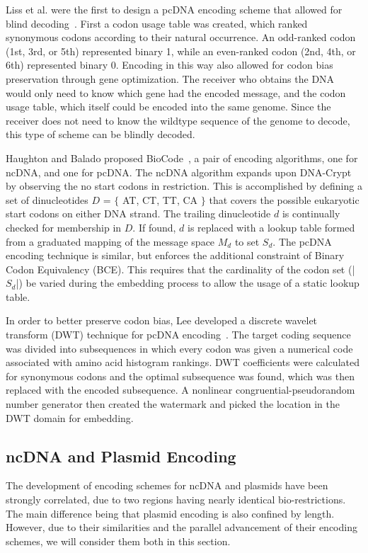 \documentclass{bioinfo}
\begin{document}
Liss et al. were the first to design a pcDNA encoding scheme that allowed for blind decoding~\cite{LDBKHLW2012PO}. First a codon usage table was created, which ranked synonymous codons according to their natural occurrence. An odd-ranked codon (1st, 3rd, or 5th) represented binary 1, while an even-ranked codon (2nd, 4th, or 6th) represented binary 0. Encoding in this way also allowed for codon bias preservation through gene optimization. The receiver who obtains the DNA would only need to know which gene had the encoded message, and the codon usage table, which itself could be encoded into the same genome. Since the receiver does not need to know the wildtype sequence of the genome to decode, this type of scheme can be blindly decoded.

Haughton and Balado proposed BioCode~\cite{HBBMC2013}, a pair of encoding algorithms, one for ncDNA, and one for pcDNA. The ncDNA algorithm expands upon DNA-Crypt by observing the no start codons in restriction. This is accomplished by defining a set of dinucleotides $D$ = $\{$ AT, CT, TT, CA $\}$ that covers the possible eukaryotic start codons on either DNA strand. The trailing dinucleotide $d$ is continually checked for membership in $D$. If found, $d$ is replaced with a lookup table formed from a graduated mapping of the message space $M_d$ to set $S_d$. The pcDNA encoding technique is similar, but enforces the additional constraint of Binary Codon Equivalency (BCE). This requires that the cardinality of the codon set (|$S_d$|) be varied during the embedding process to allow the usage of a static lookup table.

In order to better preserve codon bias, Lee developed a discrete wavelet transform (DWT) technique for pcDNA encoding~\cite{L2014IS}. The target coding sequence was divided into subsequences in which every codon was given a numerical code associated with amino acid histogram rankings. DWT coefficients were calculated for synonymous codons and the optimal subsequence was found, which was then replaced with the encoded subsequence. A nonlinear congruential-pseudorandom number generator then created the watermark and picked the location in the DWT domain for embedding.

\subsection{ncDNA and Plasmid Encoding}

The development of encoding schemes for ncDNA and plasmids have been strongly correlated, due to two regions having nearly identical bio-restrictions. The main difference being that plasmid encoding is also confined by length. However, due to their similarities and the parallel advancement of their encoding schemes, we will consider them both in this section.
\end{document}
